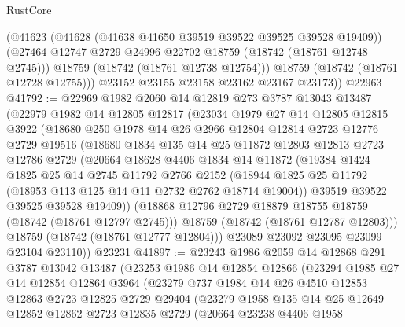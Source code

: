 \begin{lexlean}{RustCore}
\begin{coremodule}
          (@41623
            (@41628 (@41638 @41650 @39519 @39522 @39525 @39528 @19409))
            (@27464 @12747 @2729 @24996 @22702 @18759 (@18742 (@18761 @12748 @2745)))
            @18759
            (@18742 (@18761 @12738 @12754)))
          @18759
          (@18742 (@18761 @12728 @12755)))
        @23152
        @23155
        @23158
        @23162
        @23167
        @23173))
    @22963
@41792 := @22969
    @1982
    @2060
    @14
    @12819
    @273
    @3787
    @13043
    @13487
    (@22979
      @1982
      @14
      @12805
      @12817
      (@23034
        @1979
        @27
        @14
        @12805
        @12815
        @3922
        (@18680
          @250
          @1978
          @14
          @26
          @2966
          @12804
          @12814
          @2723
          @12776
          @2729
          @19516
          (@18680
            @1834
            @135
            @14
            @25
            @11872
            @12803
            @12813
            @2723
            @12786
            @2729
            (@20664
              @18628
              @4406
              @1834
              @14
              @11872
              (@19384
                @1424
                @1825
                @25
                @14
                @2745
                @11792
                @2766
                @2152
                (@18944 @1825 @25 @11792 (@18953 @113 @125 @14 @11 @2732 @2762 @18714 @19004))
                @39519
                @39522
                @39525
                @39528
                @19409))
            (@18868 @12796 @2729 @18879 @18755 @18759 (@18742 (@18761 @12797 @2745)))
            @18759
            (@18742 (@18761 @12787 @12803)))
          @18759
          (@18742 (@18761 @12777 @12804)))
        @23089
        @23092
        @23095
        @23099
        @23104
        @23110))
    @23231
@41897 := @23243
    @1986
    @2059
    @14
    @12868
    @291
    @3787
    @13042
    @13487
    (@23253
      @1986
      @14
      @12854
      @12866
      (@23294
        @1985
        @27
        @14
        @12854
        @12864
        @3964
        (@23279
          @737
          @1984
          @14
          @26
          @4510
          @12853
          @12863
          @2723
          @12825
          @2729
          @29404
          (@23279
            @1958
            @135
            @14
            @25
            @12649
            @12852
            @12862
            @2723
            @12835
            @2729
            (@20664
              @23238
              @4406
              @1958

\end{coremodule}
\end{lexlean}
